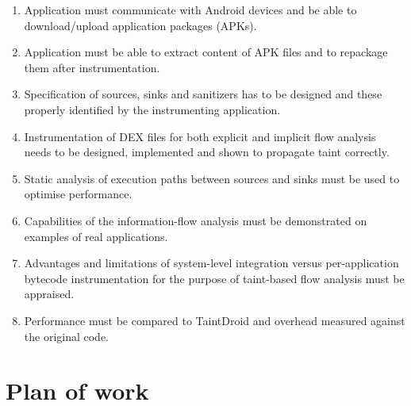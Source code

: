 \documentclass[12pt]{article}
\begin{document}
\begin{enumerate}

\item Application must communicate with Android devices and be able to
      download/upload application packages (APKs).

\item Application must be able to extract content of APK files
      and to repackage them after instrumentation.

\item Specification of sources, sinks and sanitizers has to be designed
      and these properly identified by the instrumenting application.

\item Instrumentation of DEX files for both explicit and implicit flow 
      analysis needs to be designed, implemented and shown to propagate 
      taint correctly.

\item Static analysis of execution paths between sources and sinks 
      must be used to optimise performance.

\item Capabilities of the information-flow analysis must be demonstrated
      on examples of real applications.
      
\item Advantages and limitations of system-level integration versus 
      per-application bytecode instrumentation for the purpose of 
      taint-based flow analysis must be appraised.

\item Performance must be compared to TaintDroid and overhead measured
      against the original code.

\end{enumerate}

\section*{Plan of work}
\end{document}

